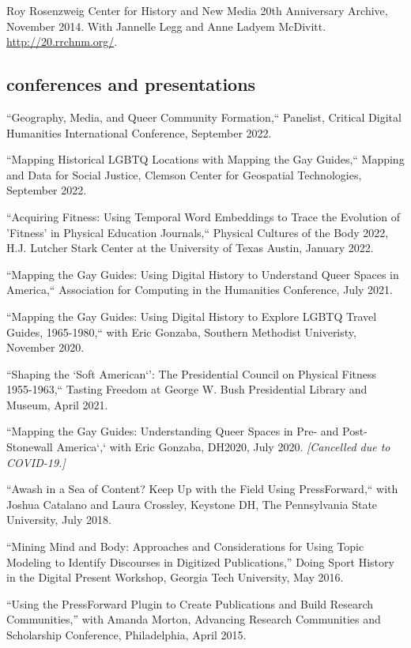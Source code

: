 \documentclass[11pt]{article}
\begin{document}
Roy Rosenzweig Center for History and New Media 20th Anniversary Archive, November 2014. With Jannelle Legg and Anne Ladyem McDivitt. \url{http://20.rrchnm.org/}.


\subsection{conferences and presentations}

``Geography, Media, and Queer Community Formation,`` Panelist, Critical Digital Humanities International Conference, September 2022.

``Mapping Historical LGBTQ Locations with Mapping the Gay Guides,`` Mapping and Data for Social Justice, Clemson Center for Geospatial Technologies, September 2022.

``Acquiring Fitness: Using Temporal Word Embeddings to Trace the Evolution of 'Fitness' in Physical Education Journals,`` Physical Cultures of the Body 2022, H.J. Lutcher Stark Center at the University of Texas Austin, January 2022.

``Mapping the Gay Guides: Using Digital History to Understand Queer Spaces in America,`` Association for Computing in the Humanities Conference, July 2021.

``Mapping the Gay Guides: Using Digital History to Explore LGBTQ Travel Guides, 1965-1980,`` with Eric Gonzaba, Southern Methodist Univeristy, November 2020.

``Shaping the `Soft American`': The Presidential Council on Physical Fitness 1955-1963,`` Tasting Freedom at George W. Bush Presidential Library and Museum, April 2021.

``Mapping the Gay Guides: Understanding Queer Spaces in Pre- and Post-Stonewall America`,` with Eric Gonzaba, DH2020, July 2020. \emph{[Cancelled due to COVID-19.]}

``Awash in a Sea of Content? Keep Up with the Field Using PressForward,`` with Joshua Catalano and Laura Crossley, Keystone DH, The Pennsylvania State University, July 2018.

``Mining Mind and Body: Approaches and Considerations for Using Topic Modeling to Identify Discourses in Digitized Publications,'' Doing Sport History in the Digital Present Workshop, Georgia Tech University, May 2016.

``Using the PressForward Plugin to Create Publications and Build Research Communities,'' with Amanda Morton, Advancing Research Communities and Scholarship Conference, Philadelphia, April 2015.
\end{document}
